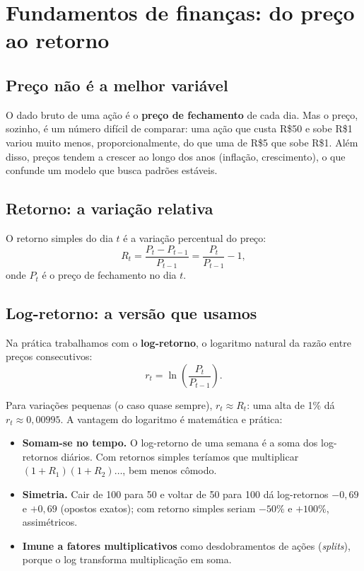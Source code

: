 \section{Fundamentos de finanças: do preço ao retorno}
\label{sec:financas}

\subsection{Preço não é a melhor variável}
O dado bruto de uma ação é o \textbf{preço de fechamento} de cada dia. Mas o
preço, sozinho, é um número difícil de comparar: uma ação que custa R\$50 e
sobe R\$1 variou muito menos, proporcionalmente, do que uma de R\$5 que sobe
R\$1. Além disso, preços tendem a crescer ao longo dos anos (inflação,
crescimento), o que confunde um modelo que busca padrões estáveis.

\subsection{Retorno: a variação relativa}
\begin{definicao}
O retorno simples do dia $t$ é a variação percentual do preço:
\[
R_t = \frac{P_t - P_{t-1}}{P_{t-1}} = \frac{P_t}{P_{t-1}} - 1 ,
\]
onde $P_t$ é o preço de fechamento no dia $t$.
\end{definicao}

\subsection{Log-retorno: a versão que usamos}
Na prática trabalhamos com o \textbf{log-retorno}, o logaritmo natural da razão
entre preços consecutivos:
\[
r_t = \ln\!\left(\frac{P_t}{P_{t-1}}\right).
\]

\begin{intuicao}
Para variações pequenas (o caso quase sempre), $r_t \approx R_t$: uma alta de
1\% dá $r_t \approx 0{,}00995$. A vantagem do logaritmo é matemática e prática:
\begin{itemize}[noitemsep]
  \item \textbf{Somam-se no tempo.} O log-retorno de uma semana é a soma dos
        log-retornos diários. Com retornos simples teríamos que multiplicar
        $(1+R_1)(1+R_2)\dots$, bem menos cômodo.
  \item \textbf{Simetria.} Cair de 100 para 50 e voltar de 50 para 100 dá
        log-retornos $-0{,}69$ e $+0{,}69$ (opostos exatos); com retorno simples
        seriam $-50\%$ e $+100\%$, assimétricos.
  \item \textbf{Imune a fatores multiplicativos} como desdobramentos de ações
        (\emph{splits}), porque o log transforma multiplicação em soma.
\end{itemize}
\end{intuicao}

